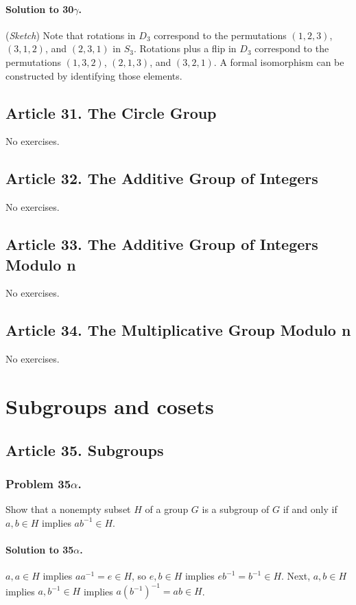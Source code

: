 \paragraph*{Solution to 30$\gamma$.}
(\textit{Sketch}) Note that rotations in $D_3$ correspond to the permutations
$(1,2,3)$, $(3,1,2)$, and $(2,3,1)$ in $S_3$. Rotations plus a flip in $D_3$
correspond to the permutations $(1,3,2)$, $(2,1,3)$, and $(3,2,1)$. A formal
isomorphism can be constructed by identifying those elements.

\subsection{Article 31. The Circle Group}

No exercises.

\subsection{Article 32. The Additive Group of Integers}

No exercises.

\subsection{Article 33. The Additive Group of Integers Modulo n}

No exercises.

\subsection{Article 34. The Multiplicative Group Modulo n}

No exercises.


\section{Subgroups and cosets}


\subsection{Article 35. Subgroups}
\subsubsection{Problem 35$\alpha$.}
Show that a nonempty subset $H$ of a group $G$ is a subgroup of $G$ if and only
if $a, b \in H$ implies $ab^{-1} \in H$.

\paragraph*{Solution to 35$\alpha$.}
$a,a \in H$ implies $aa^{-1} = e \in H$, so $e,b \in H$ implies $eb^{-1} = b^{-1}
\in H$. Next, $a, b \in H$ implies $a, b^{-1} \in H$ implies $a(b^{-1})^{-1} =
ab \in H$.

